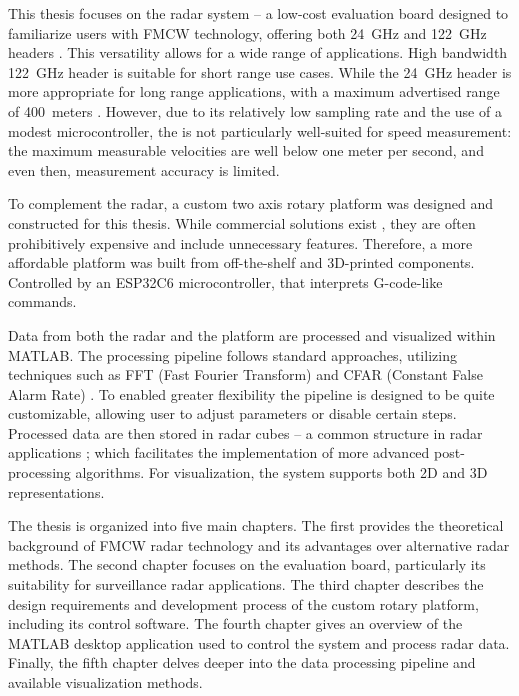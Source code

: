 This thesis focuses on the \sirad radar system -- a low-cost evaluation board designed to familiarize users with FMCW technology, offering both 24~GHz and 122~GHz headers \cite{siradMAN}.
This versatility allows for a wide range of applications.
High bandwidth 122~GHz header is suitable for short range use cases.
While the 24~GHz header is more appropriate for long range applications, with a maximum advertised range of 400~meters \cite{siradMANOld}.
However, due to its relatively low sampling rate and the use of a modest microcontroller, the \sirad is not particularly well-suited for speed measurement: the maximum measurable velocities are well below one meter per second, and even then, measurement accuracy is limited.

To complement the radar, a custom two axis rotary platform was designed and constructed for this thesis.
While commercial solutions exist \cite{standa, carl}, they are often prohibitively expensive and include unnecessary features.
Therefore, a more affordable platform was built from off-the-shelf and 3D-printed components.
Controlled by an ESP32C6 microcontroller, that interprets G-code-like commands.

Data from both the radar and the platform are processed and visualized within MATLAB.
The processing pipeline follows standard approaches, utilizing techniques such as FFT (Fast Fourier Transform) and CFAR (Constant False Alarm Rate) \cite{richards2022}.
To enabled greater flexibility the pipeline is designed to be quite customizable, allowing user to adjust parameters or disable certain steps.
Processed data are then stored in radar cubes -- a common structure in radar applications \cite{richards2022}; which facilitates the implementation of more advanced post-processing algorithms.
For visualization, the system supports both 2D and 3D representations.

The thesis is organized into five main chapters.
The first provides the theoretical background of FMCW radar technology and its advantages over alternative radar methods.
The second chapter focuses on the \sirad evaluation board, particularly its suitability for surveillance radar applications.
The third chapter describes the design requirements and development process of the custom rotary platform, including its control software.
The fourth chapter gives an overview of the MATLAB desktop application used to control the system and process radar data.
Finally, the fifth chapter delves deeper into the data processing pipeline and available visualization methods.
